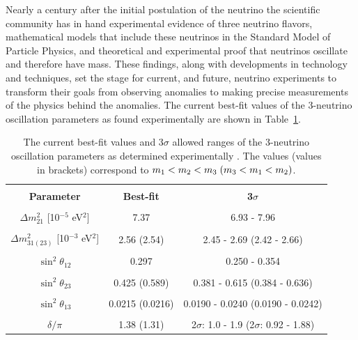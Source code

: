 Nearly a century after the initial postulation of the neutrino the scientific community has in hand experimental evidence of three neutrino flavors, mathematical models that include these neutrinos in the Standard Model of Particle Physics, and theoretical and experimental proof that neutrinos oscillate and therefore have mass.
These findings, along with developments in technology and techniques, set the stage for current, and future, neutrino experiments to transform their goals from observing anomalies to making precise measurements of the physics behind the anomalies.
The current best-fit values of the 3-neutrino oscillation parameters as found experimentally are shown in Table~\ref{tab:ParamValues}.


\begin{table}
	\centering
	\begin{tabular}{ccc}
		\hline
		\vspace{-0.3cm} \\ 
		\textbf{Parameter} & \textbf{Best-fit} & \textbf{3$\sigma$} \vspace{0.1cm} \\ 
		\hline 
		\vspace{-0.3cm} \\
		$\Delta m^2_{21}$ [10$^{-5}$ eV$^2$] & 7.37 & 6.93 - 7.96 \\ 
		\vspace{-0.3cm} \\
		$\Delta m^2_{31(23)}$ [10$^{-3}$ eV$^2$] & 2.56 (2.54) & 2.45 - 2.69 (2.42 - 2.66) \\ 
		\vspace{-0.3cm} \\
		$\sin^2\theta_{12}$  & 0.297 & 0.250 - 0.354 \\ 
		\vspace{-0.3cm} \\
		$\sin^2\theta_{23}$  & 0.425 (0.589) & 0.381 - 0.615 (0.384 - 0.636) \\ 
		\vspace{-0.3cm} \\
		$\sin^2\theta_{13}$  & 0.0215 (0.0216) & 0.0190 - 0.0240 (0.0190 - 0.0242) \\ 
		\vspace{-0.3cm} \\
		$\delta/\pi$ & 1.38 (1.31) & 2$\sigma$: 1.0 - 1.9 (2$\sigma$: 0.92 - 1.88) \\ 
		\hline 
	\end{tabular} 
	\caption[Neutrino Oscillation Parameters]{The current best-fit values and 3$\sigma$ allowed ranges of the 3-neutrino oscillation parameters as determined experimentally \cite{PDG}. The values (values in brackets) correspond to $m_1 < m_2 < m_3 \hspace{0.1cm} (m_3 < m_1 < m_2)$.}
	\label{tab:ParamValues}
\end{table}


